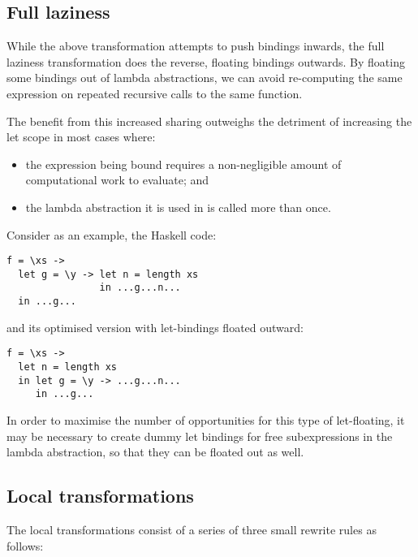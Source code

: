 \subsection*{Full laziness}

While the above transformation attempts to push bindings inwards, the full laziness transformation does the reverse, floating bindings outwards. By floating some bindings out of lambda abstractions, we can avoid re-computing the same expression on repeated recursive calls to the same function.\citep{jones1996}

The benefit from this increased sharing outweighs the detriment of increasing the let scope in most cases where:
\begin{itemize}
\item the expression being bound requires a non-negligible amount of computational work to evaluate; and
\item the lambda abstraction it is used in is called more than once.\citep{jones1996}
\end{itemize}

Consider as an example, the Haskell code\citep{jones1996}:
\begin{lstlisting}
f = \xs ->
  let g = \y -> let n = length xs
                in ...g...n...
  in ...g...
\end{lstlisting}

and its optimised version with let-bindings floated outward:
\begin{lstlisting}
f = \xs ->
  let n = length xs
  in let g = \y -> ...g...n...
     in ...g...
\end{lstlisting}

In order to maximise the number of opportunities for this type of let-floating, it may be necessary to create dummy let bindings for free subexpressions in the lambda abstraction, so that they can be floated out as well.\citep{jones1996}

\subsection*{Local transformations}

The local transformations consist of a series of three small rewrite rules as follows:

